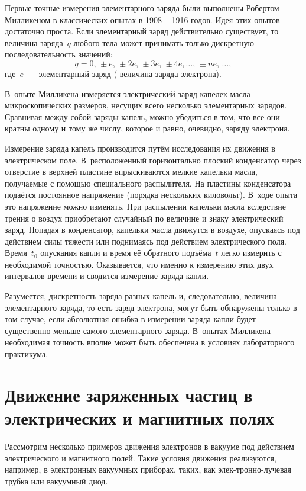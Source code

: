 Первые точные измерения элементарного заряда были выполнены Робертом Милликеном
в классических опытах в 1908 -- 1916 годов. Идея этих опытов достаточно проста.
Если элементарный заряд действительно существует, то величина заряда~$q$ любого
тела может принимать только дискретную последовательность значений:
\begin{equation*}
	q = 0,\,\pm e,\,\pm2e,\,\pm3e,\,\pm4e, \ldots,\, \pm ne,\, \ldots,
\end{equation*}
где~$e$~--- элементарный заряд ( величина заряда
электрона).

В~опыте Милликена измеряется электрический заряд капелек масла микроскопических
размеров, несущих всего несколько
элементарных зарядов. Сравнивая между собой заряды капель, можно убедиться в
том, что все они кратны одному и тому же числу, которое и равно, очевидно,
заряду электрона.

Измерение заряда капель производится путём исследования их движения в
электрическом поле. В~расположенный горизонтально плоский конденсатор через
отверстие в верхней пластине впрыскиваются мелкие капельки масла, получаемые с
помощью специального распылителя. На пластины конденсатора подаётся постоянное
напряжение (порядка нескольких киловольт). В~ходе опыта это напряжение можно
изменять. При распылении капельки масла вследствие трения о воздух приобретают
случайный по величине и знаку электрический заряд. Попадая в конденсатор,
капельки масла движутся в воздухе, опускаясь под действием силы тяжести или
поднимаясь под действием электрического поля. Время~$t_0$ опускания капли и
время её обратного подъёма~$t$ легко измерить с необходимой точностью.
Оказывается, что именно к измерению этих двух интервалов времени и сводится
измерение заряда капли.

Разумеется, дискретность заряда разных капель и, следовательно, величина
элементарного заряда, то есть заряд электрона, могут быть обнаружены только в
том случае, если абсолютная ошибка в измерении заряда капли будет существенно
меньше самого элементарного заряда. В~опытах Милликена необходимая точность
вполне может быть обеспечена в условиях лабораторного практикума.

\section{Движение заряженных частиц в электрических и магнитных полях}

Рассмотрим несколько примеров движения электронов в вакууме под действием
электрического и магнитного полей. Такие
условия движения реализуются, например, в электронных вакуумных приборах, таких,
как элек-тронно-лучевая трубка или
вакуумный диод.

